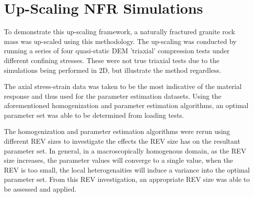 \section{Up-Scaling NFR Simulations}

To demonstrate this up-scaling framework, a naturally fractured granite rock mass was up-scaled using this methodology. The up-scaling was conducted by running a series of four quasi-static DEM 'triaxial' compression tests under different confining stresses. These were not true triaxial tests due to the simulations being performed in 2D, but illustrate the method regardless.

The axial stress-strain data was taken to be the most indicative of the material response and thus used for the parameter estimation datasets. Using the aforementioned homogenization and parameter estimation algorithms, an optimal parameter set was able to be determined from loading tests.

The homogenization and parameter estimation algorithms were rerun using different REV sizes to investigate the effects the REV size has on the resultant parameter set. In general, in a macroscopically homogenous domain, as the REV size increases, the parameter values will converge to a single value, when the REV is too small, the local heterogenaities will induce a variance into the optimal parameter set. From this REV investigation, an appropriate REV size was able to be assessed and applied. 

